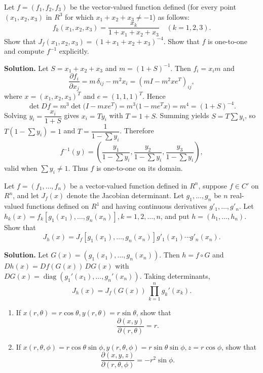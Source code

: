\begin{problembox}
Let \( f = (f_1, f_2, f_3) \) be the vector-valued function defined (for every point \( (x_1, x_2, x_3) \) in \( R^3 \) for which \( x_1 + x_2 + x_3 \neq -1 \)) as follows:
\[f_k(x_1, x_2, x_3) = \frac{x_k}{1 + x_1 + x_2 + x_3} \quad (k = 1, 2, 3).\]
Show that \( J_f(x_1, x_2, x_3) = (1 + x_1 + x_2 + x_3)^{-4} \). Show that \( f \) is one-to-one and compute \( f^{-1} \) explicitly.
\end{problembox}

\noindent\textbf{Solution.}
Let $S=x_1+x_2+x_3$ and $m=(1+S)^{-1}$. Then $f_i=x_im$ and
\[\frac{\partial f_i}{\partial x_j}=m\,\delta_{ij}-m^2 x_i=(mI-m^2xe^{\!T})_{ij},\]
where $x=(x_1,x_2,x_3)^{\!T}$ and $e=(1,1,1)^{\!T}$. Hence
\[\det Df=m^3\det\big(I-mxe^{\!T}\big)=m^3\big(1-me^{\!T}x\big)=m^4=(1+S)^{-4}.
\]
Solving $y_i=\dfrac{x_i}{1+S}$ gives $x_i=Ty_i$ with $T=1+S$. Summing yields $S=T\sum y_i$, so $T(1-\sum y_i)=1$ and $T=\dfrac{1}{1-\sum y_i}$. Therefore
\[f^{-1}(y)=\left(\frac{y_1}{1-\sum y_i},\frac{y_2}{1-\sum y_i},\frac{y_3}{1-\sum y_i}\right),\]
valid when $\sum y_i\neq 1$. Thus $f$ is one-to-one on its domain.

\begin{problembox}
Let \( f = (f_1, \ldots, f_n) \) be a vector-valued function defined in \( R^n \), suppose \( f \in C' \) on \( R^n \), and let \( J_f(x) \) denote the Jacobian determinant. Let \( g_1, \ldots, g_n \) be \( n \) real-valued functions defined on \( R^1 \) and having continuous derivatives \( g'_1, \ldots, g'_n \). Let \( h_k(x) = f_k[g_1(x_1), \ldots, g_n(x_n)], k = 1, 2, \ldots, n \), and put \( h = (h_1, \ldots, h_n) \). Show that
\[J_h(x) = J_f[g_1(x_1), \ldots, g_n(x_n)]g'_1(x_1) \cdots g'_n(x_n).\]
\end{problembox}

\noindent\textbf{Solution.}
Let $G(x)=(g_1(x_1),\dots,g_n(x_n))$. Then $h=f\circ G$ and $Dh(x)=Df(G(x))\,DG(x)$ with $DG(x)=\operatorname{diag}(g_1'(x_1),\dots,g_n'(x_n))$. Taking determinants,
\[J_h(x)=J_f(G(x))\,\prod_{k=1}^n g_k'(x_k).
\]

\begin{problembox}
\begin{enumerate}[label=(\alph*)]
    \item If \( x(r, \theta) = r \cos \theta, y(r, \theta) = r \sin \theta \), show that
    \[\frac{\partial (x, y)}{\partial (r, \theta)} = r.\]
    \item If \( x(r, \theta, \phi) = r \cos \theta \sin \phi, y(r, \theta, \phi) = r \sin \theta \sin \phi, z = r \cos \phi \), show that
    \[\frac{\partial (x, y, z)}{\partial (r, \theta, \phi)} = -r^2 \sin \phi.\]
\end{enumerate}
\end{problembox}

